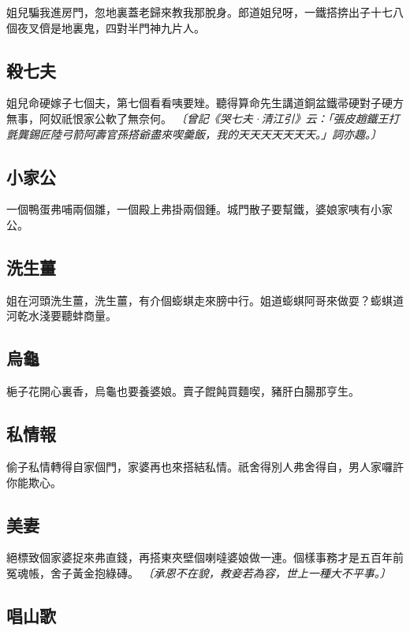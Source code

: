姐兒騙我進房門，忽地裏蓋老歸來教我那脫身。郎道姐兒呀，一鐵搭捹出子十七八個夜叉儕是地裏鬼，四對半門神九片人。

\subsection*{殺七夫}

姐兒命硬嫁子七個夫，第七個看看咦要矬。聽得算命先生講道銅盆鐵帚硬對子硬方無事，阿奴祇恨家公軟了無奈何。
\textit{〔曾記《哭七夫·清江引》云：「張皮趙鐵王打氈龔錫匠陸弓箭阿壽官孫搭爺盡來喫羹飯，我的天天天天天天天。」詞亦趣。〕}

\subsection*{小家公}

一個鴨蛋弗哺兩個雛，一個殿上弗掛兩個鍾。城門散子要幫鐵，婆娘家咦有小家公。

\subsection*{洗生薑}

姐在河頭洗生薑，洗生薑，有介個蟛蜞走來膀中行。姐道蟛蜞阿哥來做耍？蟛蜞道河乾水淺要聽蚌商量。

\subsection*{烏龜}

梔子花開心裏香，烏龜也要養婆娘。賣子餛飩買麵喫，豬肝白腸那亨生。

\subsection*{私情報}

偷子私情轉得自家個門，家婆再也來搭結私情。祇舍得別人弗舍得自，男人家囉許你能欺心。

\subsection*{美妻}

絕標致個家婆捉來弗直錢，再搭東夾壁個喇噠婆娘做一連。個樣事務才是五百年前冤魂帳，舍子黃金抱綠磚。
\textit{〔承恩不在貌，教妾若為容，世上一種大不平事。〕}

\subsection*{唱山歌}

